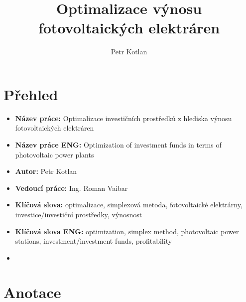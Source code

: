 \documentclass[a4paper, 12pt]{article}
\author{Petr Kotlan}
\title{Optimalizace výnosu fotovoltaických elektráren}
\date{}
\begin{document}
\maketitle
\tableofcontents

\pagebreak


\section{Přehled}

\begin{itemize}
    \item \textbf{Název práce:} Optimalizace investičních prostředků z hlediska výnosu fotovoltaických elektráren
    \item \textbf{Název práce ENG:} Optimization of investment funds in terms of photovoltaic power plants
    \item \textbf{Autor:} Petr Kotlan
    \item \textbf{Vedoucí práce:} Ing. Roman Vaibar
    \item \textbf{Klíčová slova:} optimalizace, simplexová metoda, fotovoltaické elektrárny, investice/investiční prostředky, výnosnost
    \item \textbf{Klíčová slova ENG:} optimization, simplex method, photovoltaic power stations, investment/investment funds, profitability
    \item

\end{itemize}


\section{Anotace}
\end{document}

